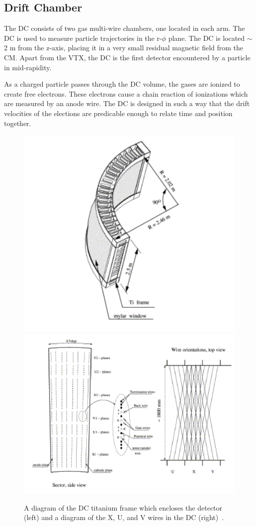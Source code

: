 \subsection{Drift Chamber}
The DC consists of two gas multi-wire chambers, one located in each arm. The DC is used to measure particle trajectories in the r-$\phi$ plane.
The DC is located $\sim$2 m from the z-axis, placing it in a very small residual magnetic field from the CM. Apart from the VTX, the DC is the first detector encountered by a particle in mid-rapidity. 

As a charged particle passes through the DC volume, the gases are ionized to create free electrons. These electrons cause a chain reaction of ionizations which are measured by an anode wire. The DC is designed in such a way that the drift velocities of the elections are predicable enough to relate time and position together. 

\begin{figure}[!ht]
\begin{center}
\includegraphics[width=0.45\linewidth]{figs/dc_diagram.png}
\includegraphics[width=0.45\linewidth]{figs/dc_wire_diagram.png}
\caption{A diagram of the DC titanium frame which encloses the detector (left) and a diagram of the X, U, and V wires in the DC (right)~\cite{Adcox2003469}.}
\label{fig:dc_diagram}
\end{center}
\end{figure}

